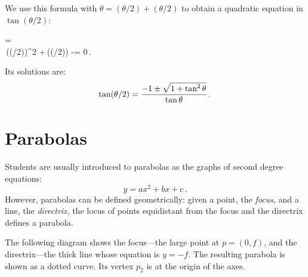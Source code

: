 We use this formula with $\theta=(\theta/2)+(\theta/2)$ to obtain a quadratic equation in $\tan(\theta/2)$:
\begin{form}{2.2}
\tan \theta=\\
\tan\theta \,(\tan(\theta/2))^2 \;+\,(\tan (\theta/2)) \;-\;\tan \theta = 0\,.
\end{form}
Its solutions are:
\[
\tan(\theta/2) = \displaystyle\frac{-1\pm\sqrt{1+\tan^2\theta}}{\tan\theta}\,.
\]

\chapter{Parabolas}\label{a.parabola}


Students are usually introduced to parabolas as the graphs of second degree equations:
\[
y=ax^2+bx+c\,.
\]
However, parabolas can be defined geometrically: given a point, the \emph{focus}, and a line, the \emph{directrix}, the locus of points equidistant from the focus and the directrix defines a parabola.


The following diagram shows the focus---the large point at $p=(0,f)$, and the directrix---the thick line whose equation is $y=-f$. The resulting parabola is shown as a dotted curve. Its vertex $p_2$ is at the origin of the axes.

